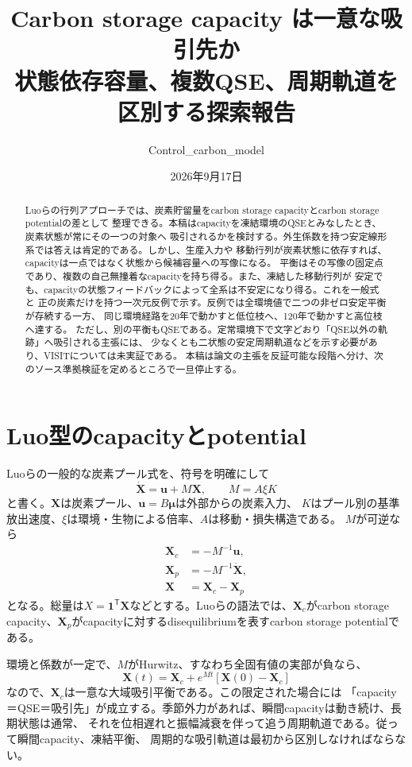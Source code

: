 \documentclass[a4paper,11pt]{ltjsarticle}
\title{Carbon storage capacity は一意な吸引先か\\
\large 状態依存容量、複数QSE、周期軌道を区別する探索報告}
\author{Control\_carbon\_model}
\date{2026年9月17日}
\newcommand{\one}{\bm 1}
\begin{document}
\maketitle
\begin{abstract}
Luoらの行列アプローチでは、炭素貯留量をcarbon storage capacityとcarbon storage potentialの差として
整理できる。本稿はcapacityを凍結環境のQSEとみなしたとき、炭素状態が常にその一つの対象へ
吸引されるかを検討する。外生係数を持つ安定線形系では答えは肯定的である。しかし、生産入力や
移動行列が炭素状態に依存すれば、capacityは一点ではなく状態から候補容量への写像になる。
平衡はその写像の固定点であり、複数の自己無撞着なcapacityを持ち得る。また、凍結した移動行列が
安定でも、capacityの状態フィードバックによって全系は不安定になり得る。これを一般式と
正の炭素だけを持つ一次元反例で示す。反例では全環境値で二つの非ゼロ安定平衡が存続する一方、
同じ環境経路を20年で動かすと低位枝へ、120年で動かすと高位枝へ達する。
ただし、別の平衡もQSEである。定常環境下で文字どおり「QSE以外の軌跡」へ吸引される主張には、
少なくとも二状態の安定周期軌道などを示す必要があり、VISITについては未実証である。
本稿は論文の主張を反証可能な段階へ分け、次のソース準拠検証を定めるところで一旦停止する。
\end{abstract}
\tableofcontents

\section{Luo型のcapacityとpotential}
Luoら\cite{luo2022}の一般的な炭素プール式を、符号を明確にして
\begin{equation}
 \dot{\bm X}=\bm u+M\bm X,\qquad M=A\xi K
 \label{eq:linear}
\end{equation}
と書く。$\bm X$は炭素プール、$\bm u=B\bm\mu$は外部からの炭素入力、
$K$はプール別の基準放出速度、$\xi$は環境・生物による倍率、$A$は移動・損失構造である。
$M$が可逆なら
\begin{align}
 \bm X_c&=-M^{-1}\bm u,\label{eq:capacity}\\
 \bm X_p&=-M^{-1}\dot{\bm X},\label{eq:potential}\\
 \bm X&=\bm X_c-\bm X_p\label{eq:identity}
\end{align}
となる。総量は$X=\one^\mathsf T\bm X$などとする。Luoらの語法では、$\bm X_c$がcarbon storage
capacity、$\bm X_p$がcapacityに対するdisequilibriumを表すcarbon storage potentialである。

環境と係数が一定で、$M$がHurwitz、すなわち全固有値の実部が負なら、
\begin{equation}
 \bm X(t)=\bm X_c+e^{Mt}[\bm X(0)-\bm X_c]
\end{equation}
なので、$\bm X_c$は一意な大域吸引平衡である。この限定された場合には
「capacity＝QSE＝吸引先」が成立する。季節外力があれば、瞬間capacityは動き続け、長期状態は通常、
それを位相遅れと振幅減衰を伴って追う周期軌道である。従って瞬間capacity、凍結平衡、
周期的な吸引軌道は最初から区別しなければならない。
\end{document}
